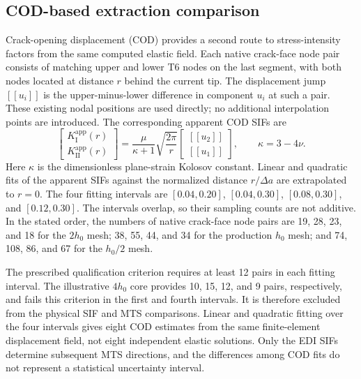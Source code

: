 \documentclass[11pt]{article}
\begin{document}
\subsection{COD-based extraction comparison}
\label{sec:cod-extraction}
Crack-opening displacement (COD) provides a second route to
stress-intensity factors from the same computed elastic field.
Each native crack-face node pair consists of matching upper and
lower T6 nodes on the last segment, with both nodes located at
distance $r$ behind the current tip. The displacement jump
$[\![u_i]\!]$ is the upper-minus-lower difference in component
$u_i$ at such a pair. These existing nodal positions are used
directly; no additional interpolation points are introduced.
The corresponding apparent COD SIFs are
\begin{equation}
 \begin{bmatrix}K_{\mathrm{I}}^{\mathrm{app}}(r)\\K_{\mathrm{II}}^{\mathrm{app}}(r)\end{bmatrix}
 =\frac{\mu}{\kappa+1}\sqrt{\frac{2\pi}{r}}
 \begin{bmatrix}{[\![u_2]\!]}\\{[\![u_1]\!]}\end{bmatrix},
 \qquad \kappa=3-4\nu.\label{eq:cod}
\end{equation}
Here $\kappa$ is the dimensionless plane-strain Kolosov constant.
Linear and quadratic fits of the apparent SIFs against the normalized
distance $r/\Delta a$ are extrapolated to $r=0$. The four fitting
intervals are $[0.04,0.20]$, $[0.04,0.30]$, $[0.08,0.30]$, and
$[0.12,0.30]$. The intervals overlap, so their sampling counts are
not additive. In the stated order, the numbers of native crack-face
node pairs are 19, 28, 23, and 18 for the $2h_0$ mesh;
38, 55, 44, and 34 for the production $h_0$ mesh; and
74, 108, 86, and 67 for the $h_0/2$ mesh.

The prescribed qualification criterion requires at least 12 pairs
in each fitting interval. The illustrative $4h_0$ core provides
10, 15, 12, and 9 pairs, respectively, and fails this criterion
in the first and fourth intervals. It is therefore excluded from
the physical SIF and MTS comparisons. Linear and quadratic fitting
over the four intervals gives eight COD estimates from the same
finite-element displacement field, not eight independent elastic
solutions. Only the EDI SIFs determine subsequent MTS directions,
and the differences among COD fits do not represent a statistical
uncertainty interval.
\end{document}
